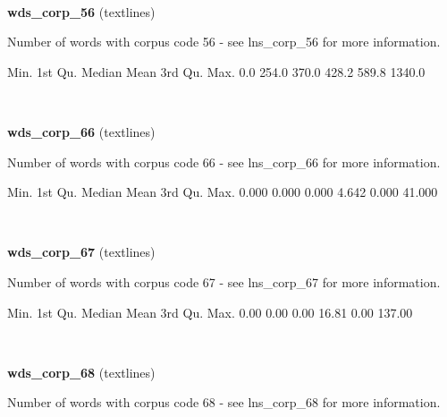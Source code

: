 \documentclass[]{article}
\newenvironment{Shaded}{\begin{snugshade}}{\end{snugshade}}
\newcommand{\FloatTok}[1]{\textcolor[rgb]{0.00,0.00,0.81}{{#1}}}
\newcommand{\NormalTok}[1]{{#1}}
\begin{document}
~

\vspace{1em}

\textbf{wds\_corp\_56} (textlines)

Number of words with corpus code 56 - see lns\_corp\_56 for more
information.

\begin{Shaded}
\begin{Highlighting}[]
   \NormalTok{Min. 1st Qu.  Median    Mean 3rd Qu.    Max. }
    \FloatTok{0.0}   \FloatTok{254.0}   \FloatTok{370.0}   \FloatTok{428.2}   \FloatTok{589.8}  \FloatTok{1340.0} 
\end{Highlighting}
\end{Shaded}

~

\vspace{1em}

\textbf{wds\_corp\_66} (textlines)

Number of words with corpus code 66 - see lns\_corp\_66 for more
information.

\begin{Shaded}
\begin{Highlighting}[]
   \NormalTok{Min. 1st Qu.  Median    Mean 3rd Qu.    Max. }
  \FloatTok{0.000}   \FloatTok{0.000}   \FloatTok{0.000}   \FloatTok{4.642}   \FloatTok{0.000}  \FloatTok{41.000} 
\end{Highlighting}
\end{Shaded}

~

\vspace{1em}

\textbf{wds\_corp\_67} (textlines)

Number of words with corpus code 67 - see lns\_corp\_67 for more
information.

\begin{Shaded}
\begin{Highlighting}[]
   \NormalTok{Min. 1st Qu.  Median    Mean 3rd Qu.    Max. }
   \FloatTok{0.00}    \FloatTok{0.00}    \FloatTok{0.00}   \FloatTok{16.81}    \FloatTok{0.00}  \FloatTok{137.00} 
\end{Highlighting}
\end{Shaded}

~

\vspace{1em}

\textbf{wds\_corp\_68} (textlines)

Number of words with corpus code 68 - see lns\_corp\_68 for more
information.
\end{document}
